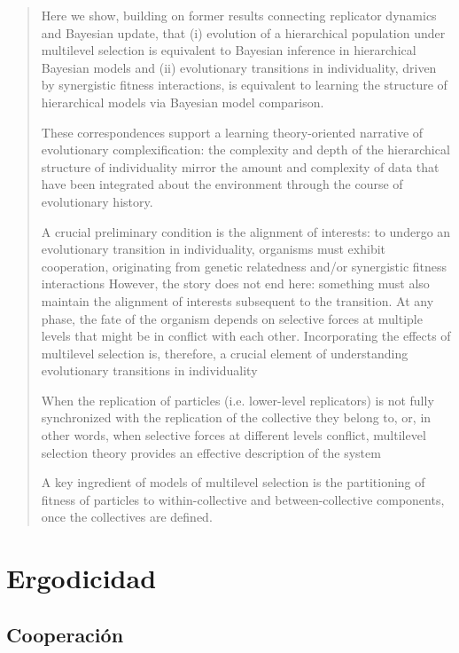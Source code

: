 \documentclass[a4paper,10pt]{article}
\begin{document}
\begin{quotation} \cite{czegel2019-bayesianEvolution}

    Here we show, building on former results connecting replicator dynamics and Bayesian update, that (i) evolution of a hierarchical population under multilevel selection is equivalent to Bayesian inference in hierarchical Bayesian models and (ii) evolutionary transitions in individuality, driven by synergistic fitness interactions, is equivalent to learning the structure of hierarchical models via Bayesian model comparison.

    These correspondences support a learning theory-oriented narrative of evolutionary complexification: the complexity and depth of the hierarchical structure of individuality mirror the amount and complexity of data that have been integrated about the environment through the course of evolutionary history.
    
    A crucial preliminary condition is the alignment of interests: to undergo an evolutionary transition in individuality, organisms must exhibit cooperation, originating from genetic relatedness and/or synergistic fitness interactions
    However, the story does not end here: something must also maintain the alignment of interests subsequent to the transition.
    At any phase, the fate of the organism depends on selective forces at multiple levels that might be in conflict with each other.
    Incorporating the effects of multilevel selection is, therefore, a crucial element of understanding evolutionary transitions in individuality
    
    When the replication of particles (i.e. lower-level replicators) is not fully synchronized with the replication of the collective they belong to, or, in other words, when selective forces at different levels conflict, multilevel selection theory provides an effective description of the system
    
    A key ingredient of models of multilevel selection is the partitioning of fitness of particles to within-collective and between-collective components, once the collectives are defined.

    
\end{quotation}



\section{Ergodicidad}

\subsection{Cooperación}
\end{document}
